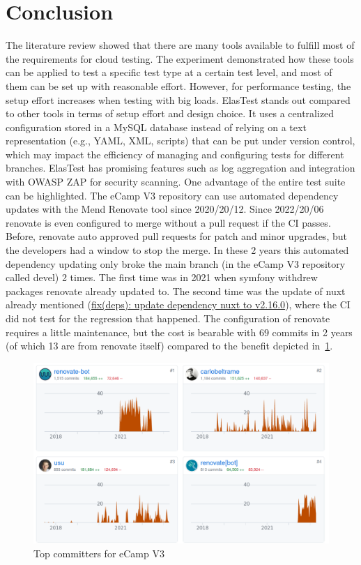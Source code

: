 \documentclass[conference]{IEEEtran}
\begin{document}
\section{Conclusion}

The literature review showed that there are many tools available to fulfill most of the requirements for cloud testing.
The experiment demonstrated how these tools can be applied to test a specific test type at a certain test level,
and most of them can be set up with reasonable effort.
However, for performance testing, the setup effort increases when testing with big loads.
ElasTest stands out compared to other tools in terms of setup effort and design choice.
It uses a centralized configuration stored in a MySQL database instead of relying on a text representation (e.g., YAML, XML, scripts)
that can be put under version control, which may impact the efficiency of managing and configuring tests for different branches.
ElasTest has promising features such as log aggregation and integration with OWASP ZAP for security scanning.
\newline
One advantage of the entire test suite can be highlighted.
The eCamp V3 repository can use automated dependency updates with the Mend Renovate\cite{renovate-website} tool since 2020/20/12\cite{ecamp3-activate-renovate}.
Since 2022/20/06 renovate is even configured to merge without a pull request if the CI passes\cite{ecamp3-no-pr-renovate}.
Before, renovate auto approved pull requests for patch and minor upgrades, but the developers had a window to stop the merge.
In these 2 years this automated dependency updating only broke the main branch (in the eCamp V3 repository called devel) 2 times.
The first time was in 2021 when symfony withdrew packages renovate already updated to\cite{renovate-first-break-of-devel}.
The second time was the update of nuxt already mentioned (\href{https://github.com/ecamp/ecamp3/commit/55c728e5b543a920a97988882df2ea99136228ea}{fix(deps): update dependency nuxt to v2.16.0}),
where the CI did not test for the regression that happened.
The configuration of renovate requires a little maintenance, but the cost is bearable with 69 commits in 2 years
(of which 13 are from renovate itself)\cite{renovate-json-history} compared to the benefit depicted in~\ref{fig:renovate-contributions}.
\begin{figure}[h!]
	\centering
	\includegraphics[width=\columnwidth]{sections/assets/renovate-contributions}
	\caption{Top committers for eCamp V3}
	\label{fig:renovate-contributions}
\end{figure}
\end{document}
